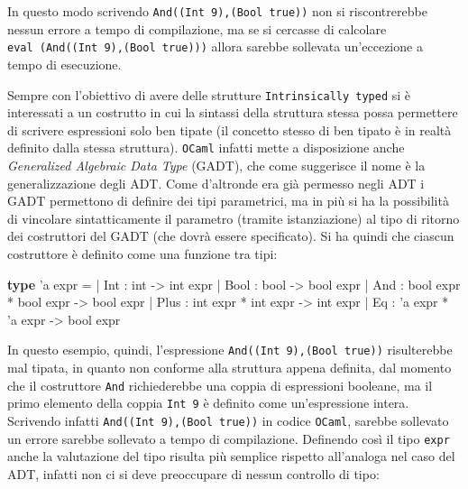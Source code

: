 \documentclass[]{article}
\newenvironment{Shaded}{}{}
\newcommand{\DataTypeTok}[1]{\textcolor[rgb]{0.56,0.13,0.00}{#1}}
\newcommand{\KeywordTok}[1]{\textcolor[rgb]{0.00,0.44,0.13}{\textbf{#1}}}
\newcommand{\NormalTok}[1]{#1}
\begin{document}
In questo modo scrivendo \texttt{And((Int\ 9),(Bool\ true))} non si
riscontrerebbe nessun errore a tempo di compilazione, ma se si cercasse
di calcolare \texttt{eval\ (And((Int\ 9),(Bool\ true)))} allora sarebbe
sollevata un'eccezione a tempo di esecuzione.

Sempre con l'obiettivo di avere delle strutture
\texttt{Intrinsically\ typed} si è interessati a un costrutto in cui la
sintassi della struttura stessa possa permettere di scrivere espressioni
solo ben tipate (il concetto stesso di ben tipato è in realtà definito
dalla stessa struttura). \texttt{OCaml} infatti mette a disposizione
anche \emph{Generalized Algebraic Data Type} (GADT), che come suggerisce
il nome è la generalizzazione degli ADT. Come d'altronde era già
permesso negli ADT i GADT permettono di definire dei tipi parametrici,
ma in più si ha la possibilità di vincolare sintatticamente il parametro
(tramite istanziazione) al tipo di ritorno dei costruttori del GADT (che
dovrà essere specificato). Si ha quindi che ciascun costruttore è
definito come una funzione tra tipi:

\begin{Shaded}
\begin{Highlighting}[]
\KeywordTok{type}\NormalTok{ 'a expr =}
\NormalTok{| Int : }\DataTypeTok{int}\NormalTok{ -> }\DataTypeTok{int}\NormalTok{ expr}
\NormalTok{| Bool : }\DataTypeTok{bool}\NormalTok{ -> }\DataTypeTok{bool}\NormalTok{ expr}
\NormalTok{| And : }\DataTypeTok{bool}\NormalTok{ expr * }\DataTypeTok{bool}\NormalTok{ expr -> }\DataTypeTok{bool}\NormalTok{ expr}
\NormalTok{| Plus : }\DataTypeTok{int}\NormalTok{ expr * }\DataTypeTok{int}\NormalTok{ expr -> }\DataTypeTok{int}\NormalTok{ expr}
\NormalTok{| Eq : 'a expr * 'a expr -> }\DataTypeTok{bool}\NormalTok{ expr}
\end{Highlighting}
\end{Shaded}

In questo esempio, quindi, l'espressione
\texttt{And((Int\ 9),(Bool\ true))} risulterebbe mal tipata, in quanto
non conforme alla struttura appena definita, dal momento che il
costruttore \texttt{And} richiederebbe una coppia di espressioni
booleane, ma il primo elemento della coppia \texttt{Int\ 9} è definito
come un'espressione intera. Scrivendo infatti
\texttt{And((Int\ 9),(Bool\ true))} in codice \texttt{OCaml}, sarebbe
sollevato un errore sarebbe sollevato a tempo di compilazione. Definendo
così il tipo \texttt{expr} anche la valutazione del tipo risulta più
semplice rispetto all'analoga nel caso del ADT, infatti non ci si deve
preoccupare di nessun controllo di tipo:
\end{document}

